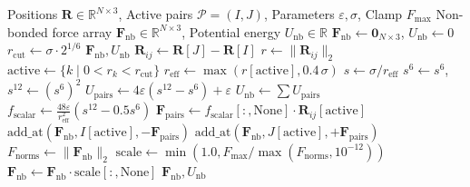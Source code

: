 \documentclass[12pt,a4paper]{article}
\begin{document}
\begin{algorithm}[H]
\caption{Vectorized Non-Bonded WCA Force Accumulation with Numerical Clamping}
\label{alg:wca}
\begin{algorithmic}[1]
\Require Positions $\mathbf{R} \in \mathbb{R}^{N \times 3}$, Active pairs $\mathcal{P} = (I, J)$, Parameters $\varepsilon, \sigma$, Clamp $F_\text{max}$
\Ensure Non-bonded force array $\mathbf{F}_\text{nb} \in \mathbb{R}^{N \times 3}$, Potential energy $U_\text{nb} \in \mathbb{R}$
\State $\mathbf{F}_\text{nb} \gets \mathbf{0}_{N \times 3}$, \quad $U_\text{nb} \gets 0$
\State $r_\text{cut} \gets \sigma \cdot 2^{1/6}$
    \State \Return $\mathbf{F}_\text{nb}, U_\text{nb}$
\EndIf
\State $\mathbf{R}_{ij} \gets \mathbf{R}[J] - \mathbf{R}[I]$
\State $r \gets \|\mathbf{R}_{ij}\|_2$
\State $\mathrm{active} \gets \{k \mid 0 < r_k < r_\text{cut}\}$
\State $r_\text{eff} \gets \max(r[\mathrm{active}], 0.4\,\sigma)$ 
\State $s \gets \sigma / r_\text{eff}$
\State $s^6 \gets s^6$, \quad $s^{12} \gets (s^6)^2$
\State $U_\text{pairs} \gets 4\varepsilon (s^{12} - s^6) + \varepsilon$
\State $U_\text{nb} \gets \sum U_\text{pairs}$
\State $f_\text{scalar} \gets \frac{48\varepsilon}{r_\text{eff}^2} (s^{12} - 0.5 s^6)$
\State $\mathbf{F}_\text{pairs} \gets f_\text{scalar}[:, \mathrm{None}] \cdot \mathbf{R}_{ij}[\mathrm{active}]$
\State $\mathrm{add\_at}(\mathbf{F}_\text{nb}, I[\mathrm{active}], -\mathbf{F}_\text{pairs})$ 
\State $\mathrm{add\_at}(\mathbf{F}_\text{nb}, J[\mathrm{active}], +\mathbf{F}_\text{pairs})$
\State $F_\text{norms} \gets \|\mathbf{F}_\text{nb}\|_2$
\State $\mathrm{scale} \gets \min(1.0, F_\text{max} / \max(F_\text{norms}, 10^{-12}))$
\State $\mathbf{F}_\text{nb} \gets \mathbf{F}_\text{nb} \cdot \mathrm{scale}[:, \mathrm{None}]$ 
\State \Return $\mathbf{F}_\text{nb}, U_\text{nb}$
\end{algorithmic}
\end{algorithm}
\end{document}
